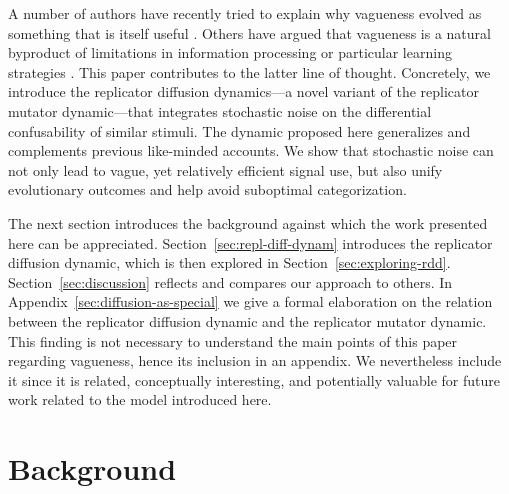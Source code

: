 \documentclass[fleqn,reqno,10pt]{article}
\begin{document}
A number of authors have recently tried to explain why vagueness
evolved as something that is itself useful
\citep[e.g.][]{Jaegherde-Jaegher2003:A-Game-Theoreti,Deemter2009:Utility-and-Lan,BlumeBoard2013:Intentional-Vag}.
Others have argued that vagueness is a natural byproduct of
limitations in information processing or particular learning
strategies
\citep[e.g.][]{FrankeJager2010:Vagueness-Signa,OConnor2013:The-Evolution-o}. This
paper contributes to the latter line of thought. Concretely, we
introduce the replicator diffusion dynamics---a novel variant of the
replicator mutator dynamic---that integrates stochastic noise on the
differential confusability of similar stimuli. The dynamic proposed
here generalizes and complements previous like-minded accounts. We
show that stochastic noise can not only lead to vague, yet relatively
efficient signal use, but also unify evolutionary outcomes and
help avoid suboptimal categorization.

The next section introduces the background against which the work
presented here can be appreciated. Section~\ref{sec:repl-diff-dynam}
introduces the replicator diffusion dynamic, which is then explored in Section~\ref{sec:exploring-rdd}.
Section~\ref{sec:discussion} reflects and compares
our approach to others.
In Appendix~\ref{sec:diffusion-as-special} we give a formal elaboration on the relation between the replicator diffusion dynamic and the replicator mutator dynamic.
This finding is not necessary to understand the main points of this paper regarding vagueness, hence its inclusion in an appendix.
We nevertheless include it since it is related, conceptually interesting, and potentially valuable for future work related to the model introduced here.

\section{Background}
\label{sec:background}

\end{document}
